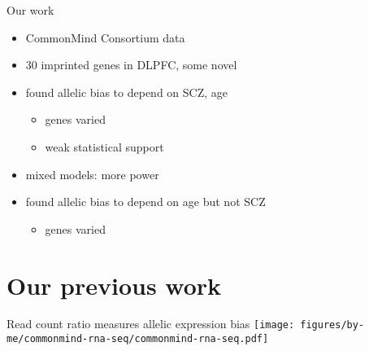\documentclass[usenames,dvipsnames]{beamer} %
\begin{document}
\begin{frame}{Our   work}
\begin{itemize}
\item<1> CommonMind Consortium data
\item<1> 30 imprinted genes in DLPFC, some novel
\item<1> found allelic bias to depend on SCZ, age
\begin{itemize}
\item genes varied
\item weak statistical support 
\end{itemize}
\item<2> mixed models: more power
\item<2> found allelic bias to depend on age but \alert{not} SCZ
\begin{itemize}
\item genes varied
\end{itemize}
\end{itemize}
\end{frame}

\section{Our previous work}

\begin{frame}{Read count ratio measures allelic expression bias}
\texttt{[image: figures/by-me/commonmind-rna-seq/commonmind-rna-seq.pdf]}
\end{frame}
\end{document}
